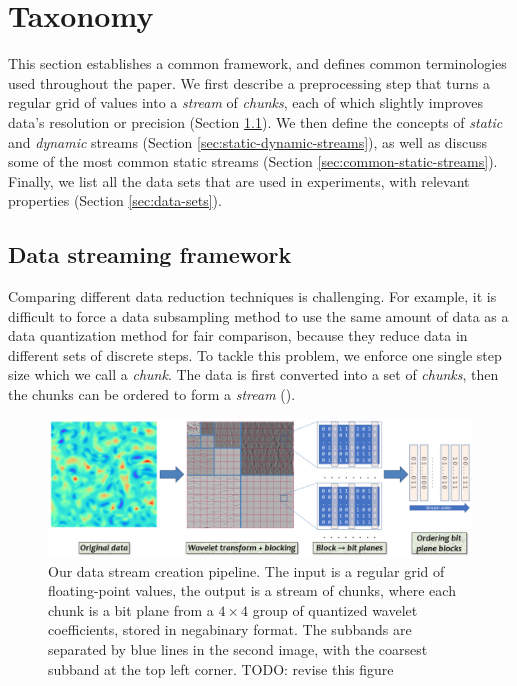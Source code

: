 \section{Taxonomy}
\label{sec:terminologies}

This section establishes a common framework, and defines common terminologies used throughout the
paper. We first describe a preprocessing step that turns a regular grid of values into a
\emph{stream} of \emph{chunks}, each of which slightly improves data's resolution or precision
(Section \ref{sec:raw-to-stream}). We then define the concepts of \emph{static} and \emph{dynamic}
streams (Section \ref{sec:static-dynamic-streams}), as well as discuss some of the most common
static streams (Section \ref{sec:common-static-streams}). Finally, we list all the data sets that are
used in experiments, with relevant properties (Section \ref{sec:data-sets}).

\subsection{Data streaming framework}
\label{sec:raw-to-stream}

Comparing different data reduction techniques is challenging. For example, it is difficult to force
a data subsampling method to use the same amount of data as a data quantization method for fair
comparison, because they reduce data in different sets of discrete steps. To tackle this problem, we
enforce one single step size which we call a \emph{chunk}. The data is first converted into a set of
\emph{chunks}, then the chunks can be ordered to form a \emph{stream} ().

\begin{figure}[h]
  \centering
  \includegraphics[width=\linewidth]{img/pipeline.png}
  \caption{Our data stream creation pipeline. The input is a regular grid of floating-point values,
  the output is a stream of chunks, where each chunk is a bit plane from a $4\times 4$ group of
  quantized wavelet coefficients, stored in negabinary format. The subbands are separated by blue
  lines in the second image, with the coarsest subband at the top left corner. TODO: revise this
  figure}
  \label{fig:pipeline}
\end{figure}


